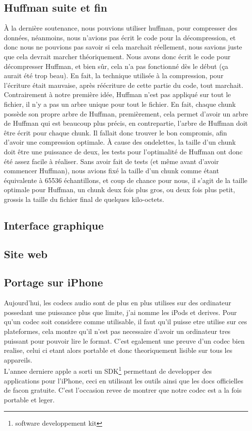 \documentclass[a4paper,12pt]{article}
\begin{document}
	\subsection{Huffman suite et fin}
À la dernière soutenance, nous pouvions utiliser huffman, pour compresser des
données, néanmoins, nous n'avions pas écrit le code pour la décompression, et
donc nous ne pouvions pas savoir si cela marchait réellement, nous savions juste
que cela devrait marcher théoriquement. Nous avons donc écrit le code pour
décompresser Huffman, et bien sûr, cela n'a pas fonctionné dès le début (ça
aurait été trop beau). En fait, la technique utilisée à la compression, pour
l'écriture était mauvaise, après réécriture de cette partie du code, tout
marchait.\\
Contrairement à notre première idée, Huffman n'est pas appliqué sur tout le
fichier, il n'y a pas un arbre unique pour tout le fichier. En fait, chaque
chunk possède son propre arbre de Huffman, premièrement, cela permet d'avoir un
arbre de Huffman qui est beaucoup plus précis, en contrepartie, l'arbre de
Huffman doit être écrit pour chaque chunk. Il fallait donc trouver le bon
compromis, afin d'avoir une compression optimale. À cause des ondelettes, la
taille d'un chunk doit être une puissance de deux, les tests pour l'optimalité
de Huffman ont donc été assez facile à réaliser. Sans avoir fait de tests (et
même avant d'avoir commencer Huffman), nous avions fixé la taille d'un chunk
comme étant équivalente à 65536 échantillons, et coup de chance pour nous, il
s'agit de la taille optimale pour Huffman, un chunk deux fois plus gros, ou deux
fois plus petit, grossis la taille du fichier final de quelques
kilo-octets.\\
	\subsection{Interface graphique}
	\subsection{Site web}
	\subsection{Portage sur iPhone}
Aujourd'hui, les codecs audio sont de plus en plus utilises sur des
ordinateur possedant une puissance plus que limite, j'ai nomme les iPods
et derives. Pour qu'un codec soit considere comme utilisable, il faut
qu'il puisse etre utilise sur ces plateformes, cela montre qu'il n'est
pas necessaire d'avoir un ordinateur tres puissant pour pouvoir lire le
format. C'est egalement une preuve d'un codec bien realise, celui ci
etant alors portable et donc theoriquement lisible sur tous les
appareils.\\
L'annee derniere apple a sorti un SDK\footnote{software developpement
kit} permettant de developper des applications pour l'iPhone, ceci en
utilisant les outils ainsi que les docs officielles de facon gratuite.
C'est l'occasion revee de montrer que notre codec est a la fois
portable et leger.\\
\end{document}
